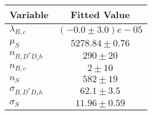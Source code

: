 \begin{tabular}[t]{lc}
\hline
Variable &Fitted Value\\
\hline\hline
$\lambda_{B,c}$&$(-0.0\pm3.0)e-05$\\
\hline
$\mu_S$&$5278.84\pm0.76$\\
\hline
$n_{B, D^* D_s h}$&$290\pm20$\\
\hline
$n_{B,c}$&$2\pm10$\\
\hline
$n_S$&$582\pm19$\\
\hline
$\sigma_{B, D^* D_s h}$&$62.1\pm3.5$\\
\hline
$\sigma_S$&$11.96\pm0.59$\\
\hline
\end{tabular}